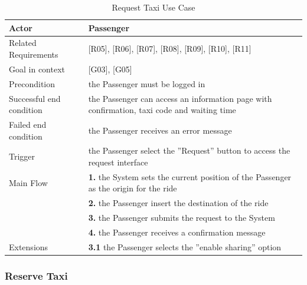\begin{table}[htbp]
\begin{center}
\begin{tabular}[t]{p{}p{}}

\hline
Actor & Passenger \\
\hline
Related Requirements & [R05], [R06], [R07], [R08], [R09], [R10], [R11] \\
\hline
Goal in context & [G03], [G05] \\
\hline
Precondition & the Passenger must be logged in \\
\hline
Successful end condition & 
the Passenger can access an information page with confirmation, taxi code and waiting time
 \\
\hline
Failed end condition & the Passenger receives an error message  \\
\hline
Trigger & the Passenger select the ''Request'' button to access the request interface \\
\hline
Main Flow & \textbf{1.} the System sets the current position of the Passenger as the origin for the ride \\
& \textbf{2.} the Passenger insert the destination of the ride \\
& \textbf{3.} the Passenger submits the request to the System \\
& \textbf{4.} the Passenger receives a confirmation message \\
\hline
Extensions & \textbf{3.1} the Passenger selects the ''enable sharing'' option \\
\hline

\end{tabular}
\end{center}
\caption{Request Taxi Use Case}
\end{table}
\clearpage

\subsubsection{Reserve Taxi}


